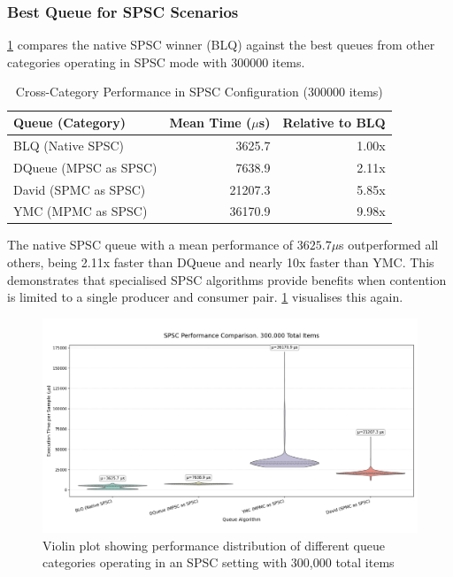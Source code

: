 \subsubsection{Best Queue for \ac{SPSC} Scenarios}
\cref{tab:best-spsc} compares the native \ac{SPSC} winner (\ac{BLQ}) against the best queues from other categories operating in \ac{SPSC} mode with 300000 items.

\begin{table}[htb]
\centering
\caption{Cross-Category Performance in \ac{SPSC} Configuration (300000 items)}
\label{tab:best-spsc}
\begin{tabular}{@{}lrr@{}}
\toprule
Queue (Category) & Mean Time ($\mu$s) & Relative to \ac{BLQ} \\
\midrule
\ac{BLQ} (Native SPSC) & 3625.7 & 1.00x \\
DQueue (MPSC as SPSC) & 7638.9 & 2.11x \\
David (SPMC as SPSC) & 21207.3 & 5.85x \\
\ac{YMC} (MPMC as SPSC) & 36170.9 & 9.98x \\
\bottomrule
\end{tabular}
\end{table}

The native \ac{SPSC} queue with a mean performance of $3625.7\mu$s outperformed all others, being 2.11x faster than DQueue and nearly 10x faster than \ac{YMC}. This demonstrates that specialised \ac{SPSC} algorithms provide benefits when contention is limited to a single producer and consumer pair. \cref{fig:cross-spsc-violin} visualises this again.

\begin{figure}[htb]
\centering
\caption{Violin plot showing performance distribution of different queue categories operating in an \ac{SPSC} setting with 300,000 total items}
\label{fig:cross-spsc-violin}
\includegraphics[width=\textwidth]{images/results/best_algorithms_in_spsc_performance.png}
\end{figure}

